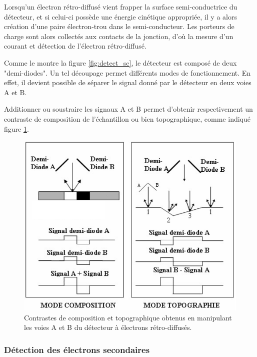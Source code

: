 \documentclass[a4paper,12pt]{article}
\begin{document}
Lorsqu'un électron rétro-diffusé vient frapper la surface semi-conductrice du détecteur, 
et si celui-ci possède une énergie cinétique appropriée,
il y a alors création d'une paire électron-trou dans le semi-conducteur. 
Les porteurs de charge sont alors collectés aux contacts de la jonction, d'où la mesure d'un courant et détection de l'électron rétro-diffusé.

Comme le montre la figure \ref{fig:detect_sc}, le détecteur est composé de deux "demi-diodes".
Un tel découpage permet différents modes de fonctionnement.
En effet, il devient possible de séparer le signal donné par le détecteur en deux voies A et B.

Additionner ou soustraire les signaux A et B permet d'obtenir respectivement un contraste de composition de l'échantillon ou bien topographique, comme indiqué figure \ref{fig:detect_sc_contraste}.

\begin{figure}
\centering
\includegraphics[width = 0.9 \textwidth]{images/detect_sc_contraste.png}
\caption{Contrastes de composition et topographique obtenus en manipulant les voies A et B du détecteur à électrons rétro-diffusés.}
\label{fig:detect_sc_contraste}
\end{figure}







\subsubsection*{Détection des électrons secondaires}
\end{document}
